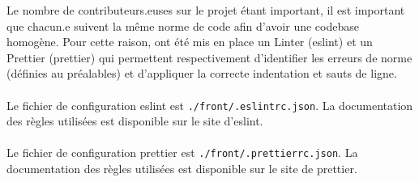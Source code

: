 Le nombre de contributeurs.euses sur le projet étant important, il est important que chacun.e suivent la même norme de code afin d’avoir une codebase homogène.
Pour cette raison, ont été mis en place un Linter (eslint) et un Prettier (prettier) qui permettent respectivement d'identifier les erreurs de norme (définies au préalables) et d’appliquer la correcte indentation et sauts de ligne.
\\\\
Le fichier de configuration eslint est \verb|./front/.eslintrc.json|. La documentation des règles utilisées est disponible sur le site d’eslint.
\\\\
Le fichier de configuration prettier est \verb|./front/.prettierrc.json|. La documentation des règles utilisées est disponible sur le site de prettier.
